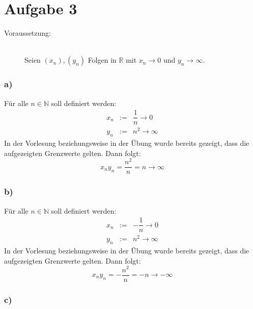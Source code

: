 \documentclass[10pt, a4paper]{article}
\begin{document}

	\newpage

	\section*{Aufgabe 3} %
	\label{sec:aufgabe_3}
	
		\begin{description}
			\item[Voraussetzung:] \hfill \\
				Seien $(x_n),(y_n)$ Folgen in $\mathbb{R}$ mit $x_n\longrightarrow 0$ und $y_n \longrightarrow \infty$.
		\end{description}
		
		\subsubsection*{a)} %
		\label{ssub:a_}
			
			Für alle $n \in \mathbb{N}$ soll definiert werden:
			\begin{eqnarray*}
				x_n &:=& \dfrac{1}{n} \longrightarrow 0 \\
				y_n &:=& n^2 \longrightarrow \infty
			\end{eqnarray*}
			In der Vorlesung beziehungsweise in der Übung wurde bereits gezeigt, dass die aufgezeigten Grenzwerte gelten. Dann folgt:
			\[
				x_ny_n = \dfrac{n^2}{n} = n \longrightarrow \infty
			\]

		
		\subsubsection*{b)} %
		\label{ssub:b_}
		
			Für alle $n \in \mathbb{N}$ soll definiert werden:
			\begin{eqnarray*}
				x_n &:=& -\dfrac{1}{n} \longrightarrow 0 \\
				y_n &:=& n^2 \longrightarrow \infty
			\end{eqnarray*}
			In der Vorlesung beziehungsweise in der Übung wurde bereits gezeigt, dass die aufgezeigten Grenzwerte gelten. Dann folgt:
			\[
				x_ny_n = -\dfrac{n^2}{n} = -n \longrightarrow -\infty
			\]


		\subsubsection*{c)} %
		\label{ssub:c_}
		
\end{document}
